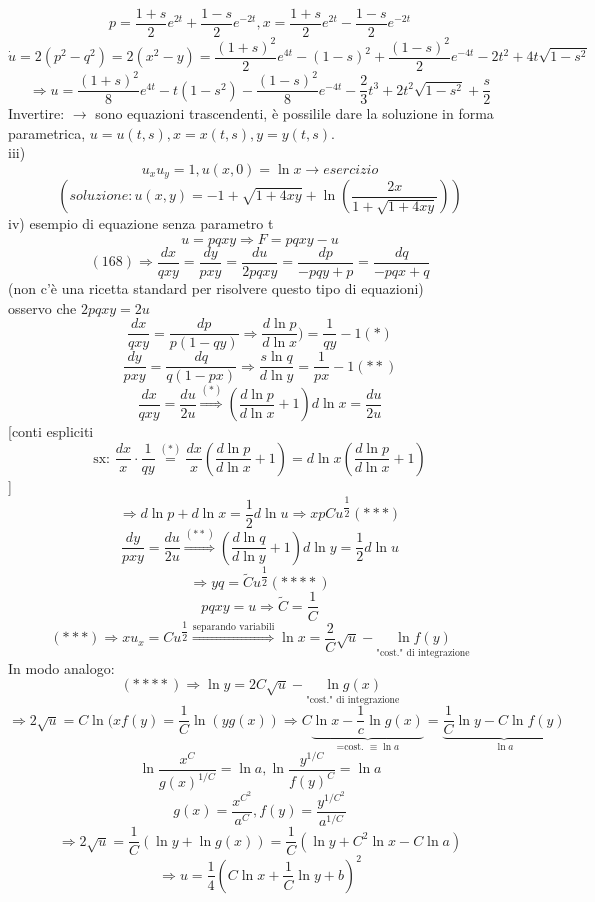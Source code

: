 \documentclass[a4paper,11pt]{report}
\begin{document}
$$
p=\dfrac{1+s}{2}e^{2t}+\dfrac{1-s}{2}e^{-2t}, x=\dfrac{1+s}{2}e^{2t}-\dfrac{1-s}{2}e^{-2t}
$$
$$
\dot{u}=2(p^2-q^2)=2(x^2-y) = \dfrac{(1+s)^2}{2}e^{4t} - (1-s)^2+\dfrac{(1-s)^2}{2}e^{-4t}-2t^2 + 4t\sqrt{1-s^2}
$$
$$
\Rightarrow u=\dfrac{(1+s)^2}{8}e^{4t} - t(1-s^2) - \dfrac{(1-s)^2}{8}e^{-4t}-\dfrac{2}{3}t^3 + 2t^2\sqrt{1-s^2}+\dfrac{s}{2}
$$
Invertire: $\rightarrow$ sono equazioni trascendenti, è possilile dare la soluzione in forma parametrica, $u=u(t,s), x=x(t,s), y=y(t,s)$.\\
iii)
$$
u_xu_y=1, u(x,0)=\ln x \rightarrow esercizio
$$
$$
\left(soluzione: u(x,y)=-1+\sqrt{1+4xy}+\ln \left(\dfrac{2x}{1+\sqrt{1+4xy}}\right)\right)
$$
iv) esempio di equazione senza parametro t
$$
u=pqxy \Rightarrow F=pqxy-u
$$
$$
(168)\Rightarrow \dfrac{dx}{qxy}=\dfrac{dy}{pxy} =\dfrac{du}{2pqxy}=\dfrac{dp}{-pqy+p}=\dfrac{dq}{-pqx+q}
$$
(non c'è una ricetta standard per risolvere questo tipo di equazioni)\\
osservo che $2pqxy=2u$
$$
\dfrac{dx}{qxy}=\dfrac{dp}{p(1-qy)}\Rightarrow \dfrac{d\ln p}{d\ln x})=\dfrac{1}{qy}-1 (*)
$$
$$
\dfrac{dy}{pxy}=\dfrac{dq}{q(1-px)}\Rightarrow \dfrac{s \ln q}{d \ln y}=\dfrac{1}{px}-1 (**)
$$
$$
\dfrac{dx}{qxy}=\dfrac{du}{2u}\overset{(*)}{\Rightarrow} \left(\dfrac{d\ln p}{d\ln x}+1\right)d\ln x = \dfrac{du}{2u}
$$
[conti espliciti
$$
\text{sx: }\dfrac{dx}{x}\cdot \dfrac{1}{qy}\overset{(*)}{=}\dfrac{dx}{x}\left(\dfrac{d\ln p}{d\ln x}+1\right)=d\ln x\left(\dfrac{d\ln p}{d\ln x}+1\right)
$$
]
$$
\Rightarrow d\ln p + d\ln x=\dfrac{1}{2}d\ln u \Rightarrow xp Cu^{\dfrac{1}{2}} (***)
$$
$$
\dfrac{dy}{pxy}=\dfrac{du}{2u}\overset{(**)}{\Rightarrow}\left(\dfrac{d\ln q}{d\ln y}+1\right)d\ln y=\dfrac{1}{2}d\ln u
$$
$$
\Rightarrow yq=\tilde{C}u^{\dfrac{1}{2}} (****)
$$
$$
pqxy=u \Rightarrow \tilde{C}=\dfrac{1}{C}
$$
$$
(***) \Rightarrow xu_x = Cu^{\dfrac{1}{2}}\overset{\text{separando variabili}}{\Rightarrow}\ln x=\dfrac{2}{C}\sqrt{u}-\underset{\text{"cost." di integrazione}}{\ln f(y)}
$$
In modo analogo:
$$
(****)\Rightarrow \ln y = 2C \sqrt{u} - \underset{\text{"cost." di integrazione}}{\ln g(x)}
$$
$$
\Rightarrow 2\sqrt{u} = C\ln (xf(y) = \dfrac{1}{C}\ln (yg(x)) \Rightarrow C \underset{\text{=cost. }\equiv \ln a}{\underbrace{\ln x - \dfrac{1}{c}\ln g(x)}} = \underset{\ln a}{\underbrace{\dfrac{1}{C}\ln y - C\ln f(y)}}
$$
$$
\ln \dfrac{x^C}{g(x)^{1/C}}=\ln a, \ln \dfrac{y^{1/C}}{f(y)^C} = \ln a
$$
$$
g(x)=\dfrac{x^{C^2}}{a^C}, f(y)=\dfrac{y^{1/C^2}}{a^{1/C}}
$$
$$
\Rightarrow 2\sqrt{u}=\dfrac{1}{C} (\ln y + \ln g(x)) = \dfrac{1}{C}(\ln y + C^2 \ln x - C \ln a)
$$
$$
\Rightarrow u=\dfrac{1}{4}\left(C\ln x + \dfrac{1}{C}\ln y + b\right)^2
$$
\end{document}
